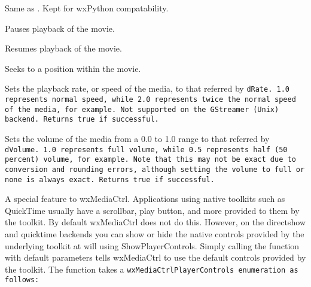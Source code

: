 \label{wxmediactrlloaduriwithproxyliteral}


Same as . Kept for wxPython compatability.


\label{wxmediactrlpause}


Pauses playback of the movie.


\label{wxmediactrlplay}


Resumes playback of the movie.


\label{wxmediactrlsetposition}


Seeks to a position within the movie.


\label{wxmediactrlsetplaybackrate}


Sets the playback rate, or speed of the media, to that referred by \tt{dRate}.
\tt{1.0} represents normal speed, while \tt{2.0} represents twice the normal
speed of the media, for example. Not supported on the GStreamer (Unix) backend.
Returns true if successful.


\label{wxmediactrlsetvolume}


Sets the volume of the media from a 0.0 to 1.0 range to that referred
by \tt{dVolume}.  \tt{1.0} represents full volume, while \tt{0.5}
represents half (50 percent) volume, for example.  Note that this may not be
exact due to conversion and rounding errors, although setting the volume to
full or none is always exact. Returns true if successful.


\label{wxmediactrlshowplayercontrols}


A special feature to wxMediaCtrl. Applications using native toolkits such as
QuickTime usually have a scrollbar, play button, and more provided to
them by the toolkit. By default wxMediaCtrl does not do this. However, on
the directshow and quicktime backends you can show or hide the native controls
provided by the underlying toolkit at will using ShowPlayerControls. Simply
calling the function with default parameters tells wxMediaCtrl to use the
default controls provided by the toolkit. The function takes a
\tt{wxMediaCtrlPlayerControls} enumeration as follows:

